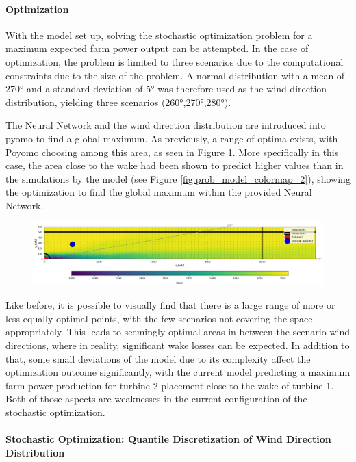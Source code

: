 \documentclass[preprint,12pt]{elsarticle}
\begin{document}
\paragraph{Optimization}

With the model set up, solving the stochastic optimization problem for a maximum expected farm power output can be attempted. In the case of optimization, the problem is limited to three scenarios due to the computational constraints due to the size of the problem. A normal distribution with a mean of 270° and  a standard deviation of 5° was therefore used as the wind direction distribution, yielding three scenarios (260°,270°,280°).

The Neural Network and the wind direction distribution are introduced into pyomo to find a global maximum. As previously, a range of optima exists, with Poyomo choosing among this area, as seen in Figure \ref{fig:prob_data_lininter}. More specifically in this case, the area close to the wake had been shown to predict higher values than in the simulations by the model (see Figure \ref{fig:prob_model_colormap_2}), showing the optimization to find the global maximum within the provided Neural Network. 

\begin{figure}[h] 
	\centering
	\includegraphics[width=1\textwidth]{../figures/optimization/prob_data_lininter.png} 
	\caption{}
	\label{fig:prob_data_lininter}
\end{figure}

Like before, it is possible to visually find that there is a large range of more or less equally optimal points, with the few scenarios not covering the space appropriately. This leads to seemingly optimal areas in between the scenario wind directions, where in reality, significant wake losses can be expected. In addition to that, some small deviations of the model due to its complexity affect the optimization outcome significantly, with the current model predicting a maximum farm power production for turbine 2 placement close to the wake of turbine 1. Both of those aspects are weaknesses in the current configuration of the stochastic optimization.

\paragraph{Stochastic Optimization: Quantile Discretization of Wind Direction Distribution } \label{subsubsection: discretization}
\end{document}
